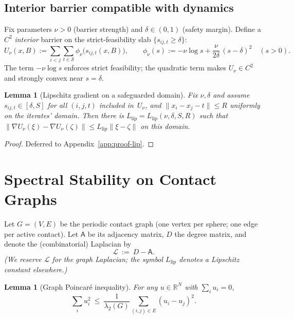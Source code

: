\documentclass[11pt]{article}
\newtheorem{lemma}[theorem]{Lemma}
\theoremstyle{remark}
\theoremstyle{definition}
\newcommand{\R}{\mathbb{R}}
\newcommand{\Llip}{L_{\text{lip}}}
\newcommand{\ShiftSet}{\mathcal{S}}            %
\begin{document}
\subsection{Interior barrier compatible with dynamics}
Fix parameters $\nu>0$ (barrier strength) and $\delta\in(0,1)$ (safety margin). Define a $C^2$ \emph{interior} barrier on the strict-feasibility slab $\{s_{ij,t}\ge \delta\}$:
\begin{equation}\label{eq:Unu}
U_\nu(x,B) := \sum_{i<j}\sum_{t\in\ShiftSet} \phi_\nu\bigl(s_{ij,t}(x,B)\bigr),\qquad
\phi_\nu(s) := -\nu\log s + \frac{\nu}{2\delta}\,(s-\delta)^2 \quad (s>0).
\end{equation}
The term $-\nu\log s$ enforces strict feasibility; the quadratic term makes $U_\nu\in C^2$ and strongly convex near $s=\delta$.

\begin{lemma}[Lipschitz gradient on a safeguarded domain]\label{lem:Lipschitz}
Fix $\nu,\delta$ and assume $s_{ij,t}\in[\delta,S]$ for all $(i,j,t)$ included in~$U_\nu$, and $\|x_i-x_j-t\|\le R$ uniformly on the iterates' domain. Then there is $\Llip=\Llip(\nu,\delta,S,R)$ such that
$\|\nabla U_\nu(\xi)-\nabla U_\nu(\zeta)\|\le \Llip\|\xi-\zeta\|$ on this domain.
\end{lemma}

\begin{proof}
Deferred to Appendix~\ref{app:proof-lip}.
\end{proof}

\section{Spectral Stability on Contact Graphs}\label{sec:spectral}
Let $G=(V,E)$ be the periodic contact graph (one vertex per sphere; one edge per active contact).
Let $\mathsf{A}$ be its adjacency matrix, $D$ the degree matrix, and denote the (combinatorial) Laplacian by
\[
\mathcal{L}\ :=\ D-\mathsf{A}.
\]
\emph{(We reserve $\mathcal{L}$ for the graph Laplacian; the symbol $\Llip$ denotes a Lipschitz constant elsewhere.)}

\begin{lemma}[Graph Poincar\'e inequality]\label{lem:poincare}
For any $u\in\R^N$ with $\sum_i u_i=0$,
\begin{equation}\label{eq:poincare}
\sum_{i} u_i^2 \ \le\ \frac{1}{\lambda_2(G)}\sum_{(i,j)\in E}(u_i-u_j)^2.
\end{equation}
\end{lemma}
\end{document}
